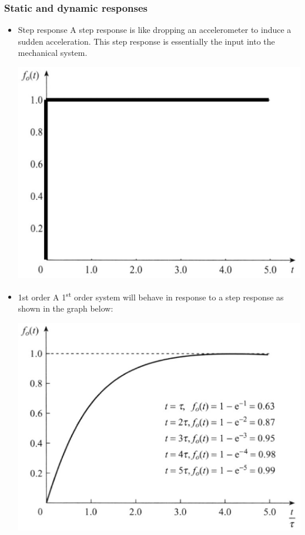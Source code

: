 \documentclass[11pt]{article}
\begin{document}
\subsubsection{Static and dynamic responses}
\label{sec:org3c317bd}
\begin{itemize}
\item Step response
A step response is like dropping an accelerometer to induce a sudden acceleration. This step response is essentially the input into the mechanical system.

\begin{center}
\includegraphics[scale=0.4]{./images/step-response.png}
\end{center}

\item 1st order
A 1\textsuperscript{st} order system will behave in response to a step response as shown in the graph below:

\begin{center}
\includegraphics[scale=0.4]{./images/first-order-system-response.png}
\end{center}
\end{itemize}
\end{document}
